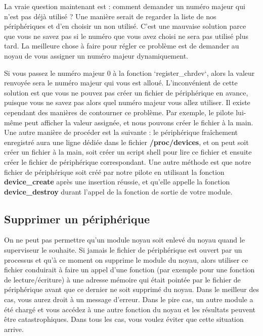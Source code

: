 \documentclass[11pt]{article}
\begin{document}
La vraie question maintenant est : comment demander un numéro majeur qui n'est pas déjà utilisé ? Une manière serait de regarder la liste de nos périphériques et d'en choisir un non utilisé. C'est une mauvaise solution parce que vous ne savez pas si le numéro que vous avez choisi ne sera pas utilisé plus tard. La meilleure chose à faire pour régler ce problème est de demander au noyau de vous assigner un numéro majeur dynamiquement.

Si vous passez le numéro majeur 0 à la fonction `register\_chrdev`, alors la valeur renvoyée sera le numéro majeur qui vous est alloué. L'inconvénient de cette solution est que vous ne pouvez pas créer un fichier de périphérique en avance, puisque vous ne savez pas alors quel numéro majeur vous allez utiliser. Il existe cependant des manières de contourner ce problème. Par exemple, le pilote lui-même peut afficher la valeur assignée, et nous pouvons créer le fichier à la main. Une autre manière de procéder est la suivante : le périphérique fraîchement enregistré aura une ligne dédiée dans le fichier \textbf{/proc/devices}, et on peut soit créer un fichier à la main, soit créer un script shell pour lire ce fichier et ensuite créer le fichier de périphérique correspondant. Une autre méthode est que notre fichier de périphérique soit créé par notre pilote en utilisant la fonction \textbf{device\_create} après une insertion réussie, et qu'elle appelle la fonction \textbf{device\_destroy}  durant l'appel de la fonction de sortie de votre module.

\subsection*{Supprimer un périphérique}
\label{sec-6-4}

On ne peut pas permettre qu'un module noyau soit enlevé du noyau quand le superviseur le souhaite. Si jamais le fichier de périphérique est ouvert par un processus et qu'à ce moment on supprime le module du noyau, alors utiliser ce fichier conduirait à faire un appel d'une fonction (par exemple pour une fonction de lecture/écriture) à une adresse mémoire qui était pointée par le fichier de périphérique avant que ce dernier ne soit supprimé du noyau. Dans le meilleur des cas, vous aurez droit à un message d'erreur. Dans le pire cas, un autre module a été chargé et vous accédez à une autre fonction du noyau et les résultats peuvent être catastrophiques. Dans tous les cas, vous voulez éviter que cette situation arrive.
\end{document}
